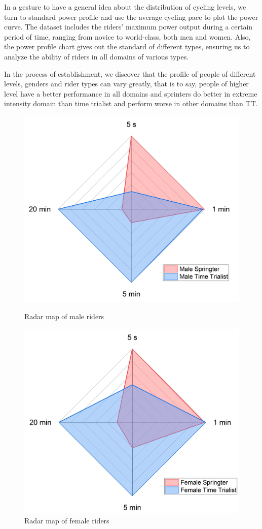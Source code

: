 In a gesture to have a general idea about the distribution of cycling levels, we turn to standard power profile and use the average cycling pace to plot the power curve. The dataset includes the riders' maximum power output during a certain period of time, ranging from novice to world-class, both men and women. Also, the power profile chart gives out the standard of different types, ensuring us to analyze the ability of riders in all domains of various types.
\par In the process of establishment, we discover that the profile of people of different levels, genders and rider types can vary greatly, that is to say, people of higher level have a better performance in all domains and sprinters do better in extreme intensity domain than time trialist and perform worse in other domains than TT.
\begin{figure}[h]
	\centering
	\begin{minipage}[t]{0.45\textwidth}
		\centering
		\includegraphics[width=0.7\linewidth]{image/radar/radar2}
		\caption{Radar map of male riders}
		\label{radar1}
	\end{minipage}
	\begin{minipage}[t]{0.45\textwidth}
		\centering
		\includegraphics[width=0.7\linewidth]{image/radar/radar1}
		\caption{Radar map of female riders}
		\label{radar2}
	\end{minipage}
\end{figure}
